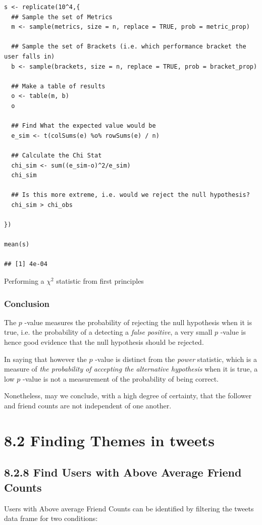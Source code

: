 \documentclass[11pt]{article}
\begin{document}
\begin{enumerate}
\begin{enumerate}
\begin{listing}[htbp]
\begin{verbatim}
s <- replicate(10^4,{
  ## Sample the set of Metrics
  m <- sample(metrics, size = n, replace = TRUE, prob = metric_prop)

  ## Sample the set of Brackets (i.e. which performance bracket the user falls in)
  b <- sample(brackets, size = n, replace = TRUE, prob = bracket_prop)

  ## Make a table of results
  o <- table(m, b)
  o

  ## Find What the expected value would be
  e_sim <- t(colSums(e) %o% rowSums(e) / n)

  ## Calculate the Chi Stat
  chi_sim <- sum((e_sim-o)^2/e_sim)
  chi_sim

  ## Is this more extreme, i.e. would we reject the null hypothesis?
  chi_sim > chi_obs

})

mean(s)

## [1] 4e-04
\end{verbatim}
\caption{\label{org9a72274}Performing a \(\chi^{2}\) statistic from first principles}
\end{listing}
\end{enumerate}
\end{enumerate}
\subsubsection{Conclusion}
\label{sec:orgfded364}
The \(p\) -value measures the probability of rejecting the null hypothesis when it
is true, i.e. the probability of a detecting a \emph{false positive}, a very small
\(p\) -value is hence good evidence that the null hypothesis should be rejected.

In saying that however the \(p\) -value is distinct from the \emph{power} statistic,
which is a measure of \emph{the probability of accepting the alternative hypothesis}
when it is true, a low \(p\) -value is not a measurement of the probability of
being correct.

Nonetheless, may we conclude, with a high degree of certainty, that the follower and
friend counts are not independent of one another.
\section{8.2 Finding Themes in tweets}
\label{sec:orgcf6ca8e}
\subsection{8.2.8 Find Users with Above Average Friend Counts}
\label{sec:org3f9a7e4}
Users with Above average Friend Counts can be identified by filtering the tweets
data frame for two conditions:
\end{document}
